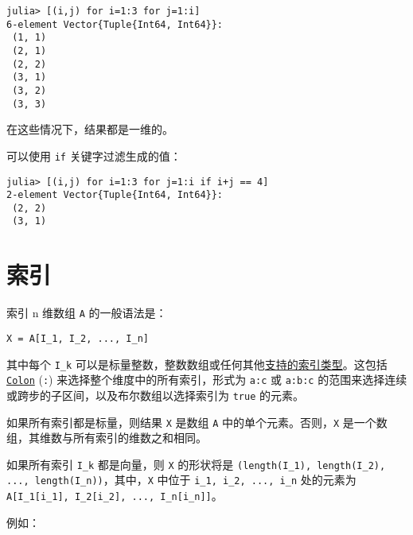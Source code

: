 \begin{verbatim}
julia> [(i,j) for i=1:3 for j=1:i]
6-element Vector{Tuple{Int64, Int64}}:
 (1, 1)
 (2, 1)
 (2, 2)
 (3, 1)
 (3, 2)
 (3, 3)
\end{verbatim}



在这些情况下，结果都是一维的。



可以使用 \texttt{if} 关键字过滤生成的值：




\begin{verbatim}
julia> [(i,j) for i=1:3 for j=1:i if i+j == 4]
2-element Vector{Tuple{Int64, Int64}}:
 (2, 2)
 (3, 1)
\end{verbatim}



\hypertarget{14469287548874312017}{}


\section{索引}



索引 n 维数组 \texttt{A} 的一般语法是：




\begin{lstlisting}
X = A[I_1, I_2, ..., I_n]
\end{lstlisting}



其中每个 \texttt{I\_k} 可以是标量整数，整数数组或任何其他\hyperlink{3335763678693018755}{支持的索引类型}。这包括 \hyperlink{13649361117037263099}{\texttt{Colon}} (\texttt{:}) 来选择整个维度中的所有索引，形式为 \texttt{a:c} 或 \texttt{a:b:c} 的范围来选择连续或跨步的子区间，以及布尔数组以选择索引为 \texttt{true} 的元素。



如果所有索引都是标量，则结果 \texttt{X} 是数组 \texttt{A} 中的单个元素。否则，\texttt{X} 是一个数组，其维数与所有索引的维数之和相同。



如果所有索引 \texttt{I\_k} 都是向量，则 \texttt{X} 的形状将是 \texttt{(length(I\_1), length(I\_2), ..., length(I\_n))}，其中，\texttt{X} 中位于 \texttt{i\_1, i\_2, ..., i\_n} 处的元素为 \texttt{A[I\_1[i\_1], I\_2[i\_2], ..., I\_n[i\_n]]}。



例如：




